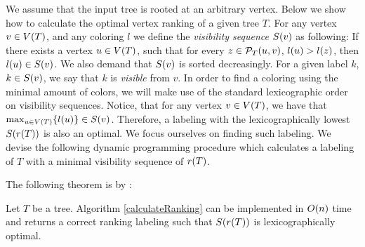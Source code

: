 We assume that the input tree is rooted at an arbitrary vertex.
Below we show how to calculate the optimal vertex ranking of a given tree $T$. For any vertex $v\in V\mathopen{}\left( T \right)$, and any coloring $l$ we define the \textit{visibility sequence} $S\mathopen{}\left( v \right)$ as following: If there exists a vertex $u\in V\mathopen{}\left( T \right)$, such that for every $z\in\mathcal{P}_T\mathopen{}\left( u,v \right)$, $l\mathopen{}\left( u \right)> l\mathopen{}\left( z \right)$, then $l\mathopen{}\left( u \right)\in S\mathopen{}\left( v \right)$. We also demand that $S\mathopen{}\left( v \right)$ is sorted decreasingly. For a given label $k$, $k\in S\mathopen{}\left( v \right)$, we say that $k$ is \textit{visible} from $v$. In order to find a coloring using the minimal amount of colors, we will make use of the standard lexicographic order on visibility sequences. Notice, that for any vertex $v\in V\mathopen{}\left( T \right)$, we have that $\max_{u\in V\mathopen{}\left( T \right)}\mathopen{}\left\{ l\mathopen{}\left( u \right) \right\}\in S\mathopen{}\left( v \right)$. Therefore, a labeling with the lexicographically lowest $S\mathopen{}\left( r\mathopen{}\left( T \right) \right)$ is also an optimal. We focus ourselves on finding such labeling. We devise the following dynamic programming procedure which calculates a labeling of $T$ with a minimal visibility sequence of $r\mathopen{}\left( T \right)$.


The following theorem is by \cite{OnakParys2006GenOfBSSInTsAndFLikePosets}:
\begin{theorem}
    Let $T$ be a tree. Algorithm \ref{calculateRanking} can be implemented in $O\mathopen{}\left( n \right)$ time and returns a correct ranking labeling such that $S\mathopen{}\left( r\mathopen{}\left( T \right) \right)$ is lexicographically optimal.
\end{theorem}

